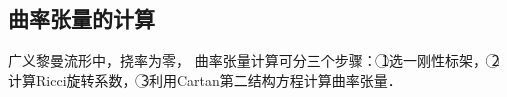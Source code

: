 




\subsection{曲率张量的计算}
    广义黎曼流形中，挠率为零，
    曲率张量计算可分三个步骤\cite[\S 1.7]{chandrasekhar-1983}：
    \textcircled{1}选一{\kaishu 刚性}标架，
    \textcircled{2}计算Ricci旋转系数，
    \textcircled{3}利用Cartan第二结构方程计算曲率张量．

